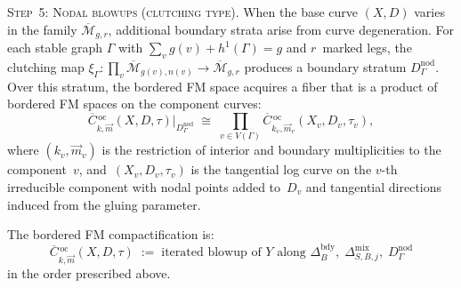 \begin{construction}
\medskip
\noindent\textsc{Step~5: Nodal blowups (clutching type).}
When the base curve $(X, D)$ varies in the family
$\overline{\mathcal{M}}_{g,r}$, additional boundary strata
arise from curve degeneration.  For each stable graph
$\Gamma$ with $\sum_v g(v) + h^1(\Gamma) = g$ and
$r$~marked legs, the clutching map
$\xi_\Gamma \colon \prod_v \overline{\mathcal{M}}_{g(v), n(v)} \to
\overline{\mathcal{M}}_{g,r}$ produces a boundary stratum
$D_\Gamma^{\mathrm{nod}}$.  Over this stratum, the bordered FM
space acquires a fiber that is a product of bordered FM spaces on
the component curves:
\begin{equation}\label{eq:nodal-fiber}
\overline{C}{}^{\,\mathrm{oc}}_{k,\vec{m}}(X, D, \tau)
\big|_{D_\Gamma^{\mathrm{nod}}}
\;\cong\;
\prod_{v \in V(\Gamma)}
\overline{C}{}^{\,\mathrm{oc}}_{k_v, \vec{m}_v}
(X_v, D_v, \tau_v),
\end{equation}
where $(k_v, \vec{m}_v)$ is the restriction of interior and
boundary multiplicities to the component~$v$, and~$(X_v, D_v,
\tau_v)$ is the tangential log curve on the $v$-th irreducible
component with nodal points added to~$D_v$ and tangential
directions induced from the gluing parameter.

\medskip
The bordered FM compactification is:
\begin{equation}\label{eq:bordered-fm-result}
\overline{C}{}^{\,\mathrm{oc}}_{k,\vec{m}}(X, D, \tau)
\;:=\;
\text{iterated blowup of } Y
\text{ along }
\Delta_B^{\mathrm{bdy}},\;
\Delta_{S,B,j}^{\mathrm{mix}},\;
D_\Gamma^{\mathrm{nod}}
\end{equation}
in the order prescribed above.
\end{construction}

